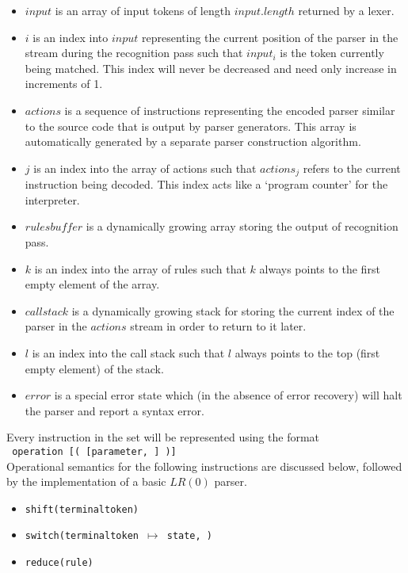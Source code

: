 \documentclass[a4paper,11pt]{article}
\begin{document}
\begin{itemize}
\item $input$ is an array of input tokens of length $input.length$ returned by a lexer.
\item $i$ is an index into $input$ representing the current position of the parser in the stream during the recognition pass such that $input_i$ is the token currently being matched.
This index will never be decreased and need only increase in increments of 1.
\item $actions$ is a sequence of instructions representing the encoded parser similar to the source code that is output by parser generators. 
This array is automatically generated by a separate parser construction algorithm.
\item $j$ is an index into the array of actions such that $actions_j$ refers to the current instruction being decoded.
This index acts like a `program counter' for the interpreter.
\item $rulesbu\!f\!f\!er$ is a dynamically growing array storing the output of recognition pass.
\item $k$ is an index into the array of rules such that $k$ always points to the first empty element of the array.
\item $callstack$ is a dynamically growing stack for storing the current index of the parser in the $actions$ stream in order to return to it later.
\item $l$ is an index into the call stack such that $l$ always points to the top (first empty element) of the stack.
\item $error$ is a special error state which (in the absence of error recovery) will halt the parser and report a syntax error.
\end{itemize}

Every instruction in the set will be represented using the format\\ \texttt{ operation [( [parameter, \textellipsis] )]}\\

Operational semantics for the following instructions are discussed below, followed by the implementation of a basic $LR(0)$ parser.
\begin{itemize}
\item \texttt{shift(terminaltoken)}
\item \texttt{switch(terminaltoken $\mapsto$ state, \textellipsis)}
\item \texttt{reduce(rule)}
\end{itemize}
\end{document}
